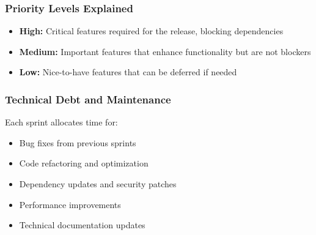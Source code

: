 \subsubsection{Priority Levels Explained}
\begin{itemize}
    \item \textbf{High:} Critical features required for the release, blocking dependencies
    \item \textbf{Medium:} Important features that enhance functionality but are not blockers
    \item \textbf{Low:} Nice-to-have features that can be deferred if needed
\end{itemize}

\subsubsection{Technical Debt and Maintenance}
Each sprint allocates time for:
\begin{itemize}
    \item Bug fixes from previous sprints
    \item Code refactoring and optimization
    \item Dependency updates and security patches
    \item Performance improvements
    \item Technical documentation updates
\end{itemize}

